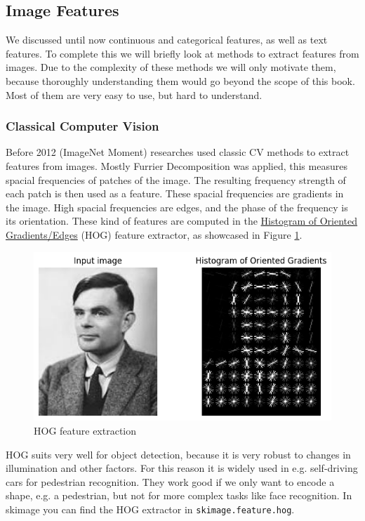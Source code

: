 \documentclass[a4paper]{article}
\begin{document}
\subsection{Image Features}
We discussed until now continuous and categorical features, as well as text features.
To complete this we will briefly look at methods to extract features from images.
Due to the complexity of these methods we will only motivate them, because thoroughly understanding them would go beyond the scope of this book.
Most of them are very easy to use, but hard to understand.

\subsubsection{Classical Computer Vision}
Before 2012 (ImageNet Moment) researches used classic CV methods to extract features from images.
Mostly Furrier Decomposition was applied, this measures spacial frequencies of patches of the image.
The resulting frequency strength of each patch is then used as a feature.
These spacial frequencies are gradients in the image. High spacial frequencies are edges,
and the phase of the frequency is its orientation.
These kind of features are computed in the \underline{Histogram of Oriented Gradients/Edges} (HOG) feature extractor, as showcased in 
Figure \ref{fig:hog}.

\begin{figure}[h]
  \centering
  \includegraphics[width=.95\textwidth]{images/hog.png}
  \caption{HOG feature extraction}
  \label{fig:hog}
\end{figure}

HOG suits very well for object detection, because it is very robust to changes in illumination and other factors.
For this reason it is widely used in e.g. self-driving cars for pedestrian recognition.
They work good if we only want to encode a shape, e.g. a pedestrian, but not for more complex tasks like face recognition.
In skimage you can find the HOG extractor in \lstinline{skimage.feature.hog}.
\end{document}
